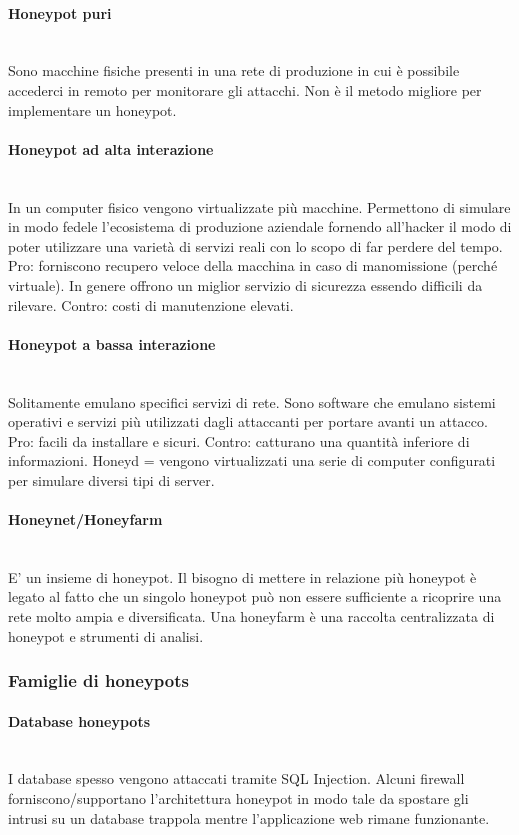 \documentclass{article}
\begin{document}
\paragraph{Honeypot puri}
\noindent
\\
Sono macchine fisiche presenti in una rete di produzione in cui è possibile accederci in remoto per monitorare gli attacchi. 
Non è il metodo migliore per implementare un honeypot.
\paragraph{Honeypot ad alta interazione}
\noindent
\\
In un computer fisico vengono virtualizzate più macchine. Permettono di simulare in modo fedele l’ecosistema di produzione 
aziendale fornendo all’hacker il modo di poter utilizzare una varietà di servizi reali con lo scopo di far perdere del tempo.
Pro: forniscono recupero veloce della macchina in caso di manomissione (perché virtuale). In genere offrono un miglior 
servizio di sicurezza essendo difficili da rilevare. Contro: costi di manutenzione elevati.
\paragraph{Honeypot a bassa interazione}
\noindent
\\
Solitamente emulano specifici servizi di rete. Sono software che emulano sistemi operativi e servizi più utilizzati 
dagli attaccanti per portare avanti un attacco. Pro: facili da installare e sicuri. Contro: catturano una quantità 
inferiore di informazioni. Honeyd = vengono virtualizzati una serie di computer configurati per simulare diversi 
tipi di server.
\paragraph{Honeynet/Honeyfarm}
\noindent
\\
E’ un insieme di honeypot. Il bisogno di mettere in relazione più honeypot è legato al fatto che un singolo honeypot può non 
essere sufficiente a ricoprire una rete molto ampia e diversificata. Una honeyfarm è una raccolta centralizzata di honeypot 
e strumenti di analisi.
\subsubsection{Famiglie di honeypots}
\paragraph{Database honeypots}
\noindent
\\
I database spesso vengono attaccati tramite SQL Injection. Alcuni firewall forniscono/supportano l’architettura honeypot in 
modo tale da spostare gli intrusi su un database trappola mentre l’applicazione web rimane funzionante.
\end{document}
